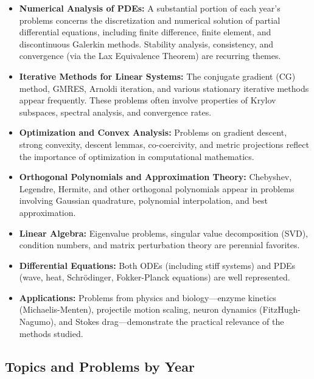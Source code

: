 \begin{itemize}
\item \textbf{Numerical Analysis of PDEs:} A substantial portion of each year's problems concerns the discretization and numerical solution of partial differential equations, including finite difference, finite element, and discontinuous Galerkin methods. Stability analysis, consistency, and convergence (via the Lax Equivalence Theorem) are recurring themes.

\item \textbf{Iterative Methods for Linear Systems:} The conjugate gradient (CG) method, GMRES, Arnoldi iteration, and various stationary iterative methods appear frequently. These problems often involve properties of Krylov subspaces, spectral analysis, and convergence rates.

\item \textbf{Optimization and Convex Analysis:} Problems on gradient descent, strong convexity, descent lemmas, co-coercivity, and metric projections reflect the importance of optimization in computational mathematics.

\item \textbf{Orthogonal Polynomials and Approximation Theory:} Chebyshev, Legendre, Hermite, and other orthogonal polynomials appear in problems involving Gaussian quadrature, polynomial interpolation, and best approximation.

\item \textbf{Linear Algebra:} Eigenvalue problems, singular value decomposition (SVD), condition numbers, and matrix perturbation theory are perennial favorites.

\item \textbf{Differential Equations:} Both ODEs (including stiff systems) and PDEs (wave, heat, Schr\"odinger, Fokker-Planck equations) are well represented.

\item \textbf{Applications:} Problems from physics and biology---enzyme kinetics (Michaelis-Menten), projectile motion scaling, neuron dynamics (FitzHugh-Nagumo), and Stokes drag---demonstrate the practical relevance of the methods studied.
\end{itemize}

\subsection{Topics and Problems by Year}

